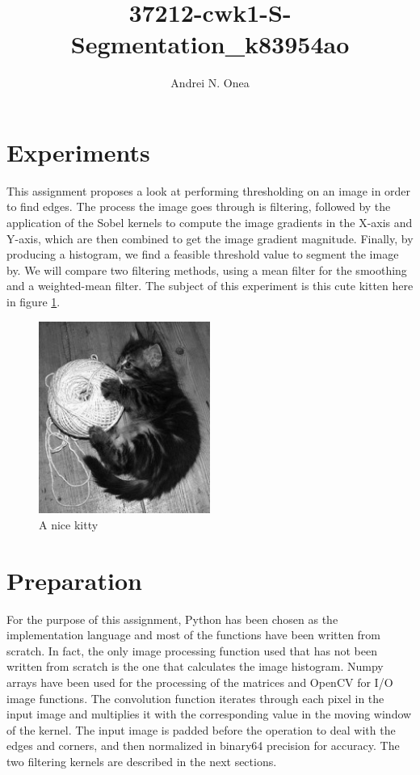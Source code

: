 \documentclass[12pt,a4paper]{article}
\author{Andrei N. Onea}
\title{37212-cwk1-S-Segmentation\_k83954ao}
\begin{document}
\maketitle

\section*{Experiments}

This assignment proposes a look at performing thresholding on an image in order to find edges. The process the image goes through is filtering, followed by the application of the Sobel kernels to compute the image gradients in the X-axis and Y-axis, which are then combined to get the image gradient magnitude. Finally, by producing a histogram, we find a feasible threshold value to segment the image by. We will compare two filtering methods, using a mean filter for the smoothing and a weighted-mean filter. The subject of this experiment is this cute kitten here in figure \ref{fig:kitty}.

\begin{figure}[h]
    \centering
    \includegraphics[width=0.5\textwidth]{kitty}
    \caption{A nice kitty}
    \label{fig:kitty}
\end{figure}

\newpage

\section*{Preparation}

For the purpose of this assignment, Python has been chosen as the implementation language and most of the functions have been written from scratch. In fact, the only image processing function used that has not been written from scratch is the one that calculates the image histogram. Numpy arrays have been used for the processing of the matrices and OpenCV for I/O image functions. The convolution function iterates through each pixel in the input image and multiplies it with the corresponding value in the moving window of the kernel. The input image is padded before the operation to deal with the edges and corners, and then normalized in binary64 precision for accuracy. The two filtering kernels are described in the next sections.
\end{document}
